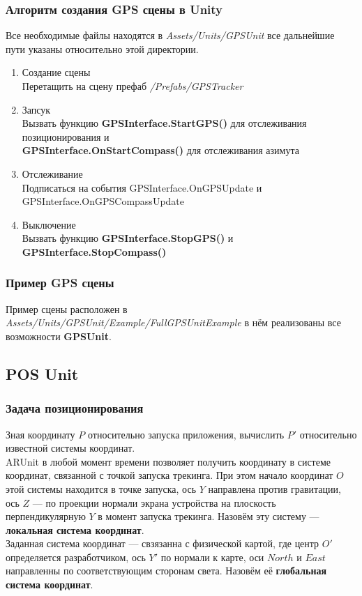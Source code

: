 \documentclass[a4paper, 11pt, titlepage]{article}
\begin{document}
    \subsubsection{Алгоритм создания GPS сцены в Unity}
      Все необходимые файлы находятся в \textit{Assets/Units/GPSUnit} все дальнейшие пути указаны относительно этой директории.
      \begin{enumerate}
        \item Создание сцены \\
          Перетащить на сцену префаб \textit{/Prefabs/GPSTracker}
        \item Запсук \\
          Вызвать функцию \textbf{GPSInterface.StartGPS()} для отслеживания позиционирования и\\ %
          \textbf{GPSInterface.OnStartCompass()} для отслеживания азимута
        \item Отслеживание \\
          Подписаться на события GPSInterface.OnGPSUpdate и GPSInterface.OnGPSCompassUpdate
        \item Выключение \\
          Вызвать функцию \textbf{GPSInterface.StopGPS()} и \textbf{GPSInterface.StopCompass()}
      \end{enumerate}

    \subsubsection{Пример GPS сцены}
      Пример сцены расположен в \textit{Assets/Units/GPSUnit/Example/FullGPSUnitExample} в нём реализованы все возможности \textbf{GPSUnit}.

    \subsection{POS Unit}
      \subsubsection{Задача позиционирования}
        Зная координату $P$ относительно запуска приложения, вычислить $P'$ относительно известной системы координат. \\
        ARUnit в любой момент времени позволяет получить координату в системе координат, связанной с точкой запуска трекинга. 
        При этом начало координат $O$ этой системы находится в точке запуска, ось $Y$ направлена против гравитации, ось $Z$ --- по 
        проекции нормали экрана устройства на плоскость перпендикулярную $Y$ в момент запуска трекинга. Назовём эту систему --- \textbf{локальная система координат}. \\
        Заданная система координат --- свзязанна с физической картой, где центр $O'$ определяется разработчиком, ось $Y'$ по нормали к карте, оси $North$ и $East$ направленны по
        соответствующим сторонам света. Назовём её \textbf{глобальная система координат}.
\end{document}
